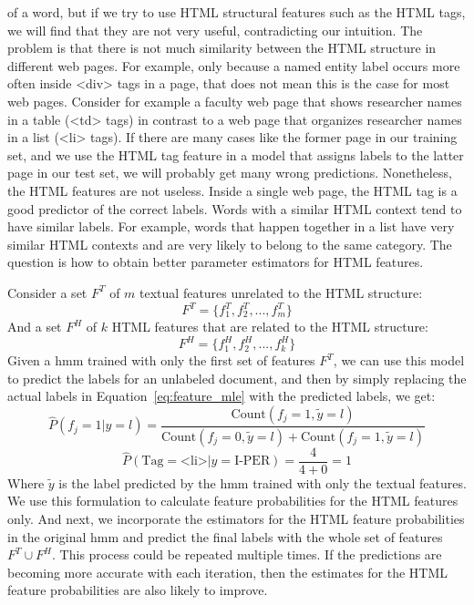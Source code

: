 \documentclass{nle}
\begin{document}
of a word, but if we try to use HTML structural features such as the HTML tags, we will find that
they are not very useful, contradicting our intuition.
The problem is that there is not much similarity between the HTML structure in different web pages.
For example, only because a named entity label occurs more often inside <div> tags
in a page, that does not mean this is the case for most web pages. Consider for example a faculty web page 
that shows researcher names in a table (<td> tags) in contrast to a web page that organizes researcher
names in a list (<li> tags). If there are many cases like the former page in our training set, and we use the 
HTML tag feature in a model that assigns labels to the latter page in our test set, we will probably get many 
wrong predictions.
Nonetheless, the HTML features are not useless. Inside a single web page, the HTML tag is a good predictor
of the correct labels. Words with a similar HTML context tend to have similar labels. For example, words
that happen together in a list have very similar HTML contexts and are very likely to belong to
the same category. The question is how to obtain better parameter estimators for HTML features.

Consider a set $ F^T $ of $ m $ textual features unrelated to the HTML structure:
%
\begin{equation*}
F^T = \{ f^T_1, f^T_2, ..., f^T_m \}
\end{equation*}
%
And a set $ F^H $ of $ k $ HTML features that are related to the HTML structure:
%
\begin{equation*}
F^H = \{ f^H_1, f^H_2, ..., f^H_k \}
\end{equation*}
%
Given a \gls{hmm} trained with only the first set of features $ F^T $,
we can use this model to predict the labels for an unlabeled document, and then by simply replacing
the actual labels in Equation~\ref{eq:feature_mle} with the predicted labels, we get:
%
\begin{equation}
\hat{P}(f_{j}=1|y=l) = \frac{\text{Count}(f_{j}=1, \tilde{y}=l)}
{\text{Count}(f_{j}=0, \tilde{y}=l) + \text{Count}(f_{j}=1, \tilde{y}=l)}
\end{equation}
%
\begin{equation}
\hat{P}(\text{Tag}=\text{<li>}|y=\text{I-PER}) = \frac{4}{4 + 0} = 1
\end{equation}
%
Where $ \tilde{y} $ is the label predicted by the \gls{hmm} trained with only the textual features.
We use this formulation to calculate feature probabilities for the HTML features only.
And next, we incorporate the estimators for the HTML feature probabilities in the original \gls{hmm} 
and predict the final labels with the whole set of features $ F^T \cup F^H $. 
This process could be repeated multiple times. If the predictions are becoming more accurate with
each iteration, then the estimates for the HTML feature probabilities are also likely to improve. 
\end{document}
